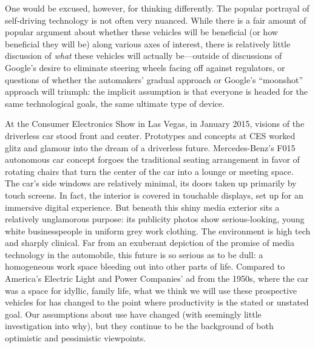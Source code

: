 One would be excused, however, for thinking differently. The popular
portrayal of self-driving technology is not often very nuanced. While
there is a fair amount of popular argument about whether these
vehicles will be beneficial (or how beneficial they will be) along
various axes of interest, there is relatively little discussion of
\emph{what} these vehicles will actually be---outside of discussions of
Google's desire to eliminate steering wheels facing off against
regulators, or questions of whether the automakers' gradual approach
or Google's ``moonshot'' approach will triumph: the implicit
assumption is that everyone is headed for the same technological
goals, the same ultimate type of device.

At the Consumer Electronics Show in Las Vegas, in January
2015, visions of the driverless car stood front and center. Prototypes
and concepts at CES worked glitz and glamour into the dream of a
driverless future. Mercedes-Benz's F015 autonomous car
concept forgoes the traditional seating arrangement in favor of
rotating chairs that turn the center of the car into a lounge or
meeting space.\cite{???} The car's side windows are relatively minimal, its
doors taken up primarily by touch screens. In fact, the interior is
covered in touchable displays, set up for an immersive digital
experience. But beneath this shiny media exterior sits a relatively
unglamorous purpose:  its publicity photos show serious-looking, young white
businesspeople in uniform grey work clothing.\cite{???} The environment is
high tech and sharply clinical. Far from an exuberant depiction of the
promise of media technology in the automobile, this future is so
serious as to be dull: a homogeneous work space bleeding out into
other parts of life. Compared to America's Electric Light and Power
Companies' ad from the 1950s, where the car was a space for idyllic,
family life, what we think we will use these prospective vehicles for
has changed to the point where productivity is the stated or unstated
goal. Our assumptions about use have changed (with seemingly little
investigation into why), but they continue to be the background of both
optimistic and pessimistic viewpoints.

